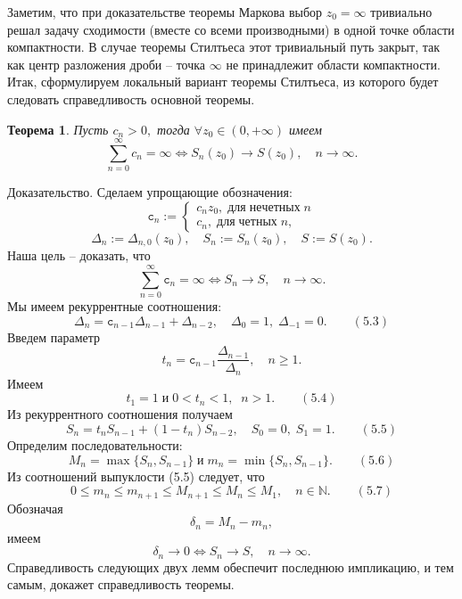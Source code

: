 \documentclass[12pt,a4paper]{article}
\theoremstyle{plain}   \newtheorem{Pro}{Задача}
\newtheorem{The}{Теорема}
\begin{document}
Заметим, что при доказательстве теоремы Маркова выбор
$ z_0 =\infty $
тривиально решал задачу сходимости (вместе со всеми производными)
в одной точке области компактности.
В случае теоремы Стилтьеса этот тривиальный путь закрыт,
так как центр разложения дроби -- точка
$ \infty $
не принадлежит области компактности.\\
Итак, сформулируем локальный вариант теоремы Стилтьеса,
из которого будет следовать справедливость
основной теоремы.
\begin{The}
Пусть
$ c_n >0 , $
тогда
$ \forall z_0 \in (0,+\infty ) $
имеем
$$
  \sum _{n=0}^{\infty}c_n =\infty \Longleftrightarrow
    S_n (z_0 ) \longrightarrow S(z_0 ),
	  \quad n \rightarrow \infty .
$$
\end{The}
{\Large Доказательство.}
Сделаем упрощающие обозначения:
\begin{equation*}
  \mathtt{c}_n:=
    \begin{cases}
	  c_n z_0 , \; \mathrm{для} \; \mathrm{нечетных} \; n \\
	  c_n , \; \mathrm{для} \; \mathrm{четных} \; n ,
	\end{cases}
\end{equation*}
$$
  \Delta _n :=\Delta _{n,0}(z_0 ), \quad
    S_n :=S_n (z_0 ), \quad
	  S:= S(z_0 ).
$$
Наша цель -- доказать, что
$$
  \sum _{n=0}^{\infty}\mathtt{c}_n =\infty
    \Longleftrightarrow S_n \longrightarrow S,
	  \quad n \rightarrow \infty .
$$
Мы имеем рекуррентные соотношения:
$$
  \Delta _n =\mathtt{c}_{n-1} \Delta _{n-1}+
    \Delta _{n-2} , \quad
	  \Delta _0 =1, \; \Delta _{-1}=0.
	    \qquad (5.3)
$$
Введем параметр
$$
  t_n =\mathtt{c}_{n-1}
    \frac{\Delta _{n-1}}{\Delta _n},
	  \quad n \geqslant 1.
$$
Имеем
$$
  t_1 =1 \; \mathrm{и} \; 0<t_n <1, \; \; n>1.
    \qquad (5.4)
$$
Из рекуррентного соотношения получаем
$$
  S_n =t_n S_{n-1}+(1-t_n )S_{n-2},
    \quad S_0 =0, \; S_1 =1 .
	  \qquad (5.5)
$$
Определим последовательности:
$$
  M_n = \max \{ S_n ,S_{n-1} \}  \; \mathrm{и} \;
    m_n = \min \{ S_n , S_{n-1} \} .
	  \qquad (5.6)
$$
Из соотношений выпуклости (5.5) следует, что
$$
  0 \leqslant m_n \leqslant m_{n+1} \leqslant
    M_{n+1} \leqslant M_n \leqslant M_1 ,
	  \quad n \in \mathbb{N} .
	    \qquad (5.7)
$$
Обозначая
$$
  \delta _n =M_n -m_n ,
$$
имеем
$$
  \delta _n \longrightarrow 0
    \Longleftrightarrow
	  S_n \longrightarrow S ,
	    \quad n \rightarrow \infty .
$$
Справедливость следующих двух лемм обеспечит последнюю импликацию,
и тем самым, докажет справедливость теоремы.
\end{document}
